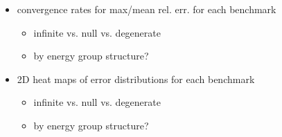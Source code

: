 \begin{itemize}[noitemsep]
  \item convergence rates for max/mean rel. err. for each benchmark
  \begin{itemize}[noitemsep]
    \item infinite vs. null vs. degenerate
    \item by energy group structure?
  \end{itemize}
  \item 2D heat maps of error distributions for each benchmark
  \begin{itemize}[noitemsep]
    \item infinite vs. null vs. degenerate
    \item by energy group structure?
  \end{itemize}
\end{itemize}

